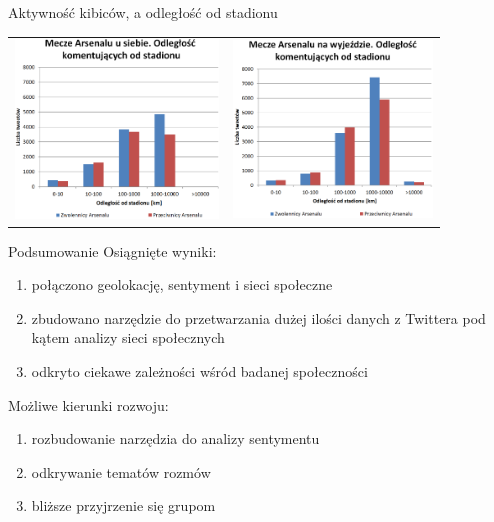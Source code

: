 \documentclass{beamer}
\begin{document}
\begin{frame}{Aktywność kibiców, a odległość od stadionu}
\begin{adjustwidth}{-5cm}{-5cm}
\begin{table}
\begin{tabular}{rl}
\includegraphics[width=5.4cm]{img/odleglosc-od-stadionu-home.png}
&
\includegraphics[width=5.3cm]{img/odleglosc-od-stadionu-away.png}
\end{tabular}
\end{table}
\end{adjustwidth}
\end{frame}







\begin{frame}{Podsumowanie}
Osiągnięte wyniki:
\begin{enumerate}
\item połączono geolokację, sentyment i sieci społeczne
\item zbudowano narzędzie do przetwarzania dużej ilości danych z Twittera pod
kątem analizy sieci społecznych
\item odkryto ciekawe zależności wśród badanej społeczności
\end{enumerate}

Możliwe kierunki rozwoju:
\begin{enumerate}
\item rozbudowanie narzędzia do analizy sentymentu
\item odkrywanie tematów rozmów
\item bliższe przyjrzenie się grupom
\end{enumerate}
 
\end{frame} 
\end{document}
